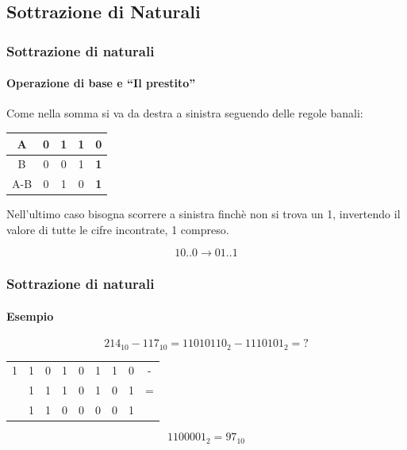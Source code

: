 \documentclass{beamer}
\begin{document}
  \subsection[NatSub]{Sottrazione di Naturali}  
	  \begin{frame}
	    \frametitle{Sottrazione di naturali}
	    \framesubtitle{Operazione di base e ``Il prestito''}
	    Come nella somma si va da destra a sinistra seguendo delle regole banali:
			
			\vspace{2em}	    
	    
	    \begin{center}
		    \begin{tabular}{|c||c|c|c|c|}
		    \hline 
		    A & 0 & 1 & 1 & \textbf{0} \\ 
		    \hline 
		    B & 0 & 0 & 1 & \textbf{1} \\ 
		    \hline 
		    A-B & 0 & 1 & 0 & \textbf{1} \\ 
		    \hline 
		    \end{tabular}
	    \end{center}
	    
	    \vspace{2em}
	    
	    Nell'ultimo caso bisogna scorrere a sinistra finchè
	    non si trova un 1, invertendo il valore di tutte le cifre incontrate, 1 compreso.
	    
	    $$ 10..0 \rightarrow 01..1 $$
	  \end{frame}
	  \begin{frame}
	    \frametitle{Sottrazione di naturali}
	    \framesubtitle{Esempio}
	    $$214_{10} - 117_{10} = 11010110_{2} - 1110101_{2} = \text{?}$$
	    \vspace{2em}
	    \pause
			\begin{center}
			\begin{tabular}{cccccccc|c} 
				1 & 1 & 0 & 1 & 0 & 1 & 1 & 0 &	- \\		 
			 		& 1 & 1 & 1 & 0 & 1 & 0 & 1 & = \\  
			\hline			 
			 & 1 & 1 & 0 & 0 & 0 & 0 & 1 &  \\ 
			\end{tabular}
			\end{center}
			\pause
			\vspace{2em}
			$$1100001_{2} = 97_{10}$$
	  \end{frame}
\end{document}
